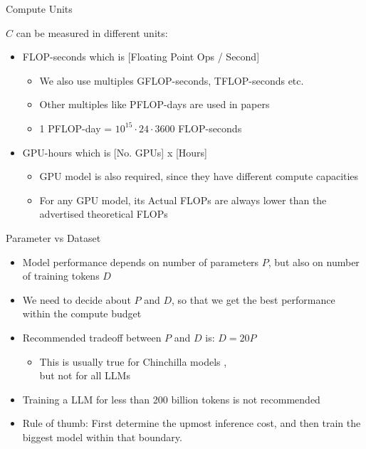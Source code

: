 
\begin{vbframe}{Compute Units}

\vfill

$C$  can be measured in different units:\newline

\begin{itemize}
    \item FLOP-seconds which is [Floating Point Ops / Second]
	\begin{itemize}
	    \item We also use multiples GFLOP-seconds, TFLOP-seconds etc.
		\item Other multiples like PFLOP-days are used in papers
		\item 1 PFLOP-day = $10^{15} \cdot 24 \cdot 3600$ FLOP-seconds
	\end{itemize}
	\item GPU-hours which is [No. GPUs] x [Hours]
	\begin{itemize}
	    \item GPU model is also required, since they have different compute capacities
		\item For any GPU model, its Actual FLOPs are always lower than the advertised theoretical FLOPs
	\end{itemize}
\end{itemize}

\vfill

\end{vbframe}


\begin{vbframe}{Parameter vs Dataset}

\vfill

\begin{itemize}
    \item Model performance depends on number of parameters $P$, but also on number of training tokens $D$
	\item We need to decide about $P$ and $D$, so that we get the best performance within the compute budget
	\item
        Recommended tradeoff between $P$ and $D$ is: $D = 20 P$
	\begin{itemize}
	    \item This is usually true for Chinchilla models ,\\but not for all LLMs
	\end{itemize}
	\item Training a LLM for less than 200 billion tokens is not recommended
	\item Rule of thumb: First determine the upmost inference cost, and then train the biggest model within that boundary.
\end{itemize}

\vfill

\end{vbframe}

